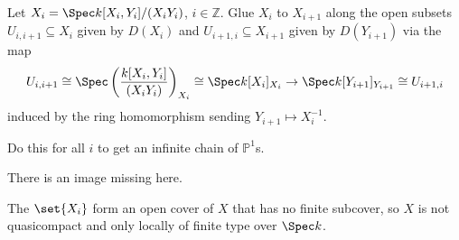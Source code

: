 Let $X_i = \Spec k[X_i, Y_i]/(X_iY_i)$, $i \in \mathbb{Z}$. Glue $X_i$ to
$X_{i+1}$ along the open subsets $U_{i, i+1} \subseteq X_i$ given by $D(X_i)$
and $U_{i+1, i} \subseteq X_{i+1}$ given by $D(Y_{i+1})$
via the map
\[ U_{i, i+1}\cong \Spec \left(\frac{k[X_i, Y_i]}{(X_iY_i)}\right)_{X_i} \cong \Spec k[X_i]_{X_i}\to \Spec k[Y_{i+1}]_{Y_{i+1}}\cong U_{i+1, i} \]
induced by the ring homomorphism sending $Y_{i+1}\mapsto X_i^{-1}$.

Do this for all $i$ to get an infinite chain of $\mathbb{P}^1$s.

There is an image missing here.

The $\set{X_i}$ form an open cover of $X$ that has no finite subcover, so $X$ is
not quasicompact and only locally of finite type over $\Spec k$.

